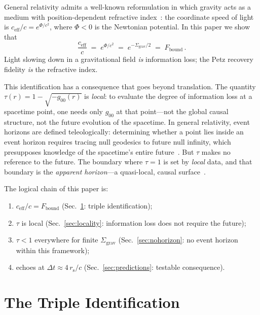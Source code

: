 \documentclass[prl,twocolumn,superscriptaddress,longbibliography,floatfix]{revtex4-2}
\newcommand{\tauasym}{\tau}
\newcommand{\ceff}{c_{\mathrm{eff}}}
\newcommand{\rs}{r_{\mathrm{s}}}
\newcommand{\Sgrav}{\Sigma_{\mathrm{grav}}}
\newcommand{\Fbound}{F_{\mathrm{bound}}}
\begin{document}
General relativity admits a well-known reformulation in which
gravity acts as a medium with position-dependent refractive
index~\cite{Dicke1957,Einstein1911}:
the coordinate speed of light is
$\ceff/c = e^{\Phi/c^2}$, where $\Phi < 0$ is the
Newtonian potential.
In this paper we show that
\begin{equation}
  \frac{\ceff}{c}
  \;=\; e^{\Phi/c^2}
  \;=\; e^{-\Sgrav/2}
  \;=\; \Fbound\,.
  \label{eq:preview}
\end{equation}
Light slowing down in a gravitational field \emph{is}
information loss; the Petz recovery fidelity \emph{is}
the refractive index.

This identification has a consequence that goes beyond
translation.
The quantity
$\tauasym(r) = 1 - \sqrt{-g_{00}(r)}$
is \emph{local}: to evaluate the degree of information
loss at a spacetime point, one needs only $g_{00}$
at that point---not the global causal structure, not
the future evolution of the spacetime.
In general relativity, event horizons are defined
teleologically: determining whether a point lies inside
an event horizon requires tracing null geodesics to
future null infinity, which presupposes knowledge of
the spacetime's entire future~\cite{Hawking1973}.
But $\tauasym$ makes no reference to the future.
The boundary where $\tauasym = 1$ is set by
\emph{local} data, and that boundary is the
\emph{apparent horizon}---a quasi-local,
causal surface~\cite{Hayward1994,AshtekarKrishnan2004}.

The logical chain of this paper is:
\begin{enumerate}
  \item $\ceff/c = \Fbound$
    (Sec.~\ref{sec:identification}: triple identification);
  \item $\tauasym$ is local
    (Sec.~\ref{sec:locality}: information loss does not
    require the future);
  \item $\tauasym < 1$ everywhere for finite $\Sgrav$
    (Sec.~\ref{sec:nohorizon}: no event horizon within
    this framework);
  \item echoes at $\Delta t \approx 4\,\rs/c$
    (Sec.~\ref{sec:predictions}: testable consequence).
\end{enumerate}

\section{The Triple Identification}
\label{sec:identification}
\end{document}
